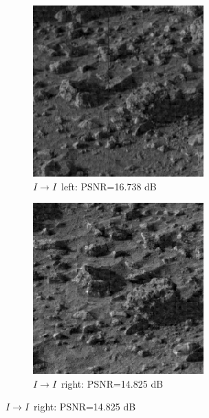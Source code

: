 \documentclass[10pt,twoside,titlepage]{article}
\newcommand{\sysII}{\mbox{$I \rightarrow I$}}
\begin{document}
\begin{figure}
    \centering
    \begin{subfigure}{0.5\textwidth}
        \centering
        \includegraphics[width=0.6\linewidth]{img/mars1_ii_left.png}
        \caption{\sysII\ left: PSNR=16.738 dB}
    \end{subfigure}%
    \begin{subfigure}{0.5\textwidth}
        \centering
        \includegraphics[width=0.6\linewidth]{img/mars1_ii_right.png}
        \caption{\sysII\ right: PSNR=14.825 dB}
    \end{subfigure}
    \label{fig:mars1_ii}


\end{figure}
\end{document}
